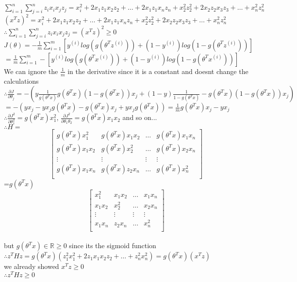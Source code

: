 \begin{answer}\\
$\sum_{i=1}^{n}\sum_{j=i}^{n}z_ix_ix_jz_j=x_i^2+2x_1z_1x_2z_2+\dots+2x_1z_1x_nz_n+x_2^2z_2^2+2x_2z_2x_3z_3+\dots+x_n^2z_n^2$\\
$(x^Tz)^2=x_i^2+2x_1z_1x_2z_2+\dots+2x_1z_1x_nz_n+x_2^2z_2^2+2x_2z_2x_3z_3+\dots+x_n^2z_n^2$\\
$\therefore \sum_{i=1}^{n}\sum_{j=i}^{n}z_ix_ix_jz_j=(x^Tz)^2 \geq 0$\\
$J(\theta)=-\frac{1}{m}\sum_{i=1}^{m}\left[ y^{(i)}log(g(\theta^T z^{(i)})) + (1-y^{(i)})log(1-g(\theta^T z^{(i)})) \right]$\\
$=\frac{1}{m}\sum_{i=1}^{m} - \left[ y^{(i)}log(g(\theta^T x^{(i)})) + (1-y^{(i)})log(1-g(\theta^T x^{(i)})) \right]$\\
We can ignore the $\frac{1}{m}$ in the derivative since it is a constant and doesnt change the calculations\\
$\therefore \frac{\partial J}{\partial \theta_j}=-(y \frac{1}{g(\theta^T x)}g(\theta^T x)(1-g(\theta^T x))x_j + (1-y)\frac{1}{1-g(\theta^T x)}-g(\theta^T x)(1-g(\theta^T x))x_j)$
$=-(yx_j-yx_jg(\theta^T x)-g(\theta^T x)x_j +yx_jg(\theta^T x))=\frac{1}{m} g(\theta^T x)x_j -yx_j$\\

$\therefore \frac{\partial J^2}{\partial \theta_1^2}=g(\theta^T x)x_1^2$, $\frac{\partial J^2}{\partial \theta_1\theta_2}=g(\theta^T x)x_1x_2$ and so on...\\
$\therefore H=$
\[
\begin{bmatrix}
g(\theta^T x)x_1^2 & g(\theta^T x)x_1x_2 & \dots & g(\theta^T x)x_1x_n \\
g(\theta^T x)x_1x_2 & g(\theta^T x)x_2^2 & \dots & g(\theta^T x)x_2x_n \\
\vdots & \vdots & \vdots  & \vdots \\
g(\theta^T x)x_1x_n & g(\theta^T x)z_2x_n & \dots & g(\theta^T x)x_n^2 \\
\end{bmatrix}
\]=$g(\theta^T x)$
\[
\begin{bmatrix}
x_1^2 & x_1x_2 & \dots & x_1x_n \\
x_1x_2 & x_2^2 & \dots & x_2x_n \\
\vdots & \vdots & \vdots  & \vdots \\
x_1x_n & z_2x_n & \dots & x_n^2 \\
\end{bmatrix}
\]\\
but $g(\theta^T x) \in \mathbb{R} \geq 0$ since its the sigmoid function\\
$\therefore z^THz=g(\theta^T x)(z_1^2x_1^2+2z_1x_1x_2z_2+\dots+z_n^2x_n^2)=g(\theta^T x)(x^Tz)$\\
we already showed $x^Tz \geq 0$\\
$\therefore z^THz \geq 0$
\end{answer}